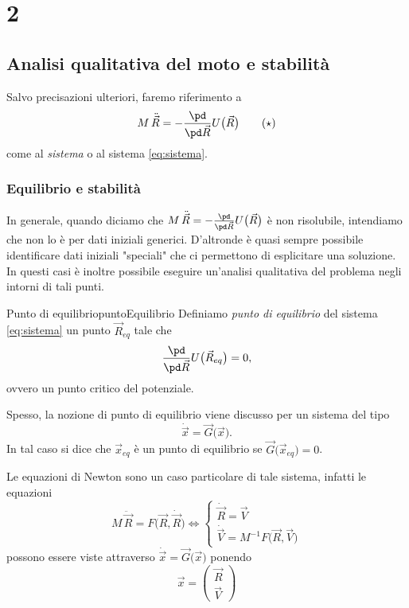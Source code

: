 %
%
\part{2}
\chapter{Analisi qualitativa del moto e stabilità}

Salvo precisazioni ulteriori, faremo riferimento a
\[\label{eq:sistema}
	M\,\ddot{\vec{R}} = -\frac{\pd}{\pd\vec{R}}U\big(\vec{R}\big)\tag{\(\star\)}
\]
come al \emph{sistema} o al sistema \eqref{eq:sistema}.

\section{Equilibrio e stabilità}

In generale, quando diciamo che \(M\,\ddot{\vec{R}} = -\frac{\pd}{\pd\vec{R}}U\big(\vec{R}\big)\) è non risolubile, intendiamo che non lo è per dati iniziali generici.
D'altronde è quasi sempre possibile identificare dati iniziali "speciali" che ci permettono di esplicitare una soluzione. In questi casi è inoltre possibile eseguire un'analisi qualitativa del problema negli intorni di tali punti.

\begin{defn}{Punto di equilibrio}{puntoEquilibrio}
	Definiamo \emph{punto di equilibrio} del sistema \eqref{eq:sistema} un punto \(\vec{R}_{eq}\) tale che
	\[
		\frac{\pd}{\pd\vec{R}}U\big(\vec{R}_{eq}\big) = 0,
	\]
	ovvero un punto critico del potenziale.
\end{defn}

\begin{oss}
	Spesso, la nozione di punto di equilibrio viene discusso per un sistema del tipo
	\[
		\dot{\vec{x}} = \vec{G}\big(\vec{x}\big).
	\]
	In tal caso si dice che \(\vec{x}_{eq}\) è un punto di equilibrio se \(\vec{G}\big(\vec{x}_{eq}\big)=0\).
	
	Le equazioni di Newton sono un caso particolare di tale sistema, infatti le equazioni
	\[
		M\,\ddot{\vec{R}} = F\big(\vec{R},\dot{\vec{R}}\big) \iff
		\begin{cases}
			\dot{\vec{R}} = \vec{V} \\
			\dot{\vec{V}} = M^{-1}F\big(\vec{R},\vec{V}\big)
		\end{cases}
	\]
	possono essere viste attraverso \(\dot{\vec{x}}=\vec{G}\big(\vec{x}\big)\) ponendo
	\[
		\vec{x} = \begin{pmatrix}\vec{R}\\\vec{V}\end{pmatrix}
	\]
\end{oss}


